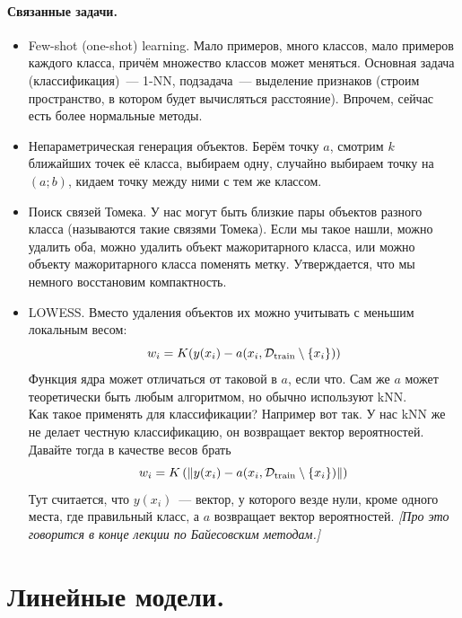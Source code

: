 \documentclass{article}
\begin{document}
    \paragraph{Связанные задачи.}
    \begin{itemize}
        \item Few-shot (one-shot) learning. Мало примеров, много классов, мало примеров каждого класса, причём множество классов может меняться. Основная задача (классификация)~--- 1-NN, подзадача~--- выделение признаков (строим пространство, в котором будет вычисляться расстояние). Впрочем, сейчас есть более нормальные методы.
        \item Непараметрическая генерация объектов. Берём точку $a$, смотрим $k$ ближайших точек её класса, выбираем одну, случайно выбираем точку на $(a;b)$, кидаем точку между ними с тем же классом.
        \item Поиск связей Томека. У нас могут быть близкие пары объектов разного класса (называются такие связями Томека). Если мы такое нашли, можно удалить оба, можно удалить объект мажоритарного класса, или можно объекту мажоритарного класса поменять метку. Утверждается, что мы немного восстановим компактность.
        \item LOWESS. Вместо удаления объектов их можно учитывать с меньшим локальным весом:
        \[
        w_i=K(y(x_i)-a(x_i,{\mathcal{D}}_{\mathrm{train}}\setminus\{x_i\}))
        \]
        Функция ядра может отличаться от таковой в $a$, если что. Сам же $a$ может теоретически быть любым алгоритмом, но обычно используют kNN.\\
        Как такое применять для классификации? Например вот так. У нас kNN же не делает честную классификацию, он возвращает вектор вероятностей. Давайте тогда в качестве весов брать
        \[
        w_i=K\left(\|y(x_i)-a(x_i,{\mathcal{D}}_{\mathrm{train}}\setminus\{x_i\})\|\right)
        \]
        Тут считается, что $y(x_i)$~--- вектор, у которого везде нули, кроме одного места, где правильный класс, а $a$ возвращает вектор вероятностей. \textit{[Про это говорится в конце лекции по Байесовским методам.]}
    \end{itemize}    
    \section{Линейные модели.}
\end{document}
